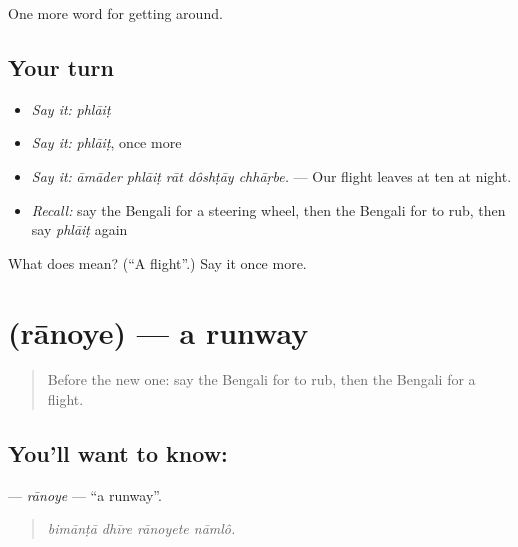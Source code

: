 \begin{grammarlens}[title={What you've built}]
One more word for getting around.
\end{grammarlens}

\subsection*{Your turn}
\begin{itemize}
\raggedright
  \item \emph{Say it:} \emph{phlāiṭ}
  \item \emph{Say it:} \emph{phlāiṭ}, once more
  \item \emph{Say it:} \emph{āmāder phlāiṭ rāt dôshṭāy chhāṛbe.} — Our flight leaves at ten at night.
  \item \emph{Recall:} say the Bengali for a steering wheel, then the Bengali for to rub, then say \emph{phlāiṭ} again
\end{itemize}

\begin{tcolorbox}[breakable,colback=teal!4,colframe=teal!35!black,title={Before you move on}]
What does  mean? (\textquotedblleft{}A flight\textquotedblright{}.) Say it once more.
\end{tcolorbox}
\section[\texorpdfstring{\bn{রানওয়ে} (rānoye)}{রানওয়ে (rānoye)}]{ (rānoye) — a runway}

\label{lesson:BN-C395-ranoye}



\begin{quote}
Before the new one: say the Bengali for to rub, then the Bengali for a flight.
\end{quote}

\subsection*{You'll want to know: }
\textbf{} — \emph{rānoye} — \textquotedblleft{}a runway\textquotedblright{}.

\begin{quote}
   
\end{quote}

\begin{quote}
\emph{bimānṭā dhīre rānoyete nāmlô.}
\end{quote}

